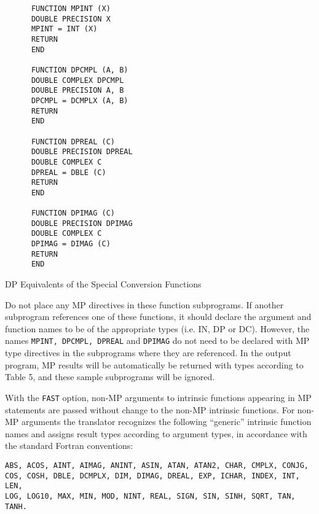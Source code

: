 \begin{table}[p]
\begin{tt} \begin{small} \begin{verbatim}
      FUNCTION MPINT (X)
      DOUBLE PRECISION X
      MPINT = INT (X)
      RETURN
      END

      FUNCTION DPCMPL (A, B)
      DOUBLE COMPLEX DPCMPL
      DOUBLE PRECISION A, B
      DPCMPL = DCMPLX (A, B)
      RETURN
      END
 
      FUNCTION DPREAL (C)
      DOUBLE PRECISION DPREAL
      DOUBLE COMPLEX C
      DPREAL = DBLE (C)
      RETURN
      END
 
      FUNCTION DPIMAG (C)
      DOUBLE PRECISION DPIMAG
      DOUBLE COMPLEX C
      DPIMAG = DIMAG (C)
      RETURN
      END
\end{verbatim} \end{small} \end{tt}
\caption{DP Equivalents of the Special Conversion Functions}
\end{table}
 
Do not place any MP directives in these function subprograms.  If
another subprogram references one of these functions, it should
declare the argument and function names to be of the appropriate types
(i.e. IN, DP or DC).  However, the names {\tt MPINT, DPCMPL, DPREAL}
and {\tt DPIMAG} do not need to be declared with MP type directives in
the subprograms where they are referenced.  In the output program, MP
results will be automatically be returned with types according to
Table 5, and these sample subprograms will be ignored.

With the {\tt FAST} option, non-MP arguments to intrinsic functions
appearing in MP statements are passed without change to the non-MP
intrinsic functions.  For non-MP arguments the translator recognizes
the following ``generic'' intrinsic function names and assigns result
types according to argument types, in accordance with the standard
Fortran conventions:
 
\begin{tt} \begin{small} \begin{verbatim}
ABS, ACOS, AINT, AIMAG, ANINT, ASIN, ATAN, ATAN2, CHAR, CMPLX, CONJG,
COS, COSH, DBLE, DCMPLX, DIM, DIMAG, DREAL, EXP, ICHAR, INDEX, INT, LEN,
LOG, LOG10, MAX, MIN, MOD, NINT, REAL, SIGN, SIN, SINH, SQRT, TAN, TANH.
\end{verbatim} \end{small} \end{tt}
 
